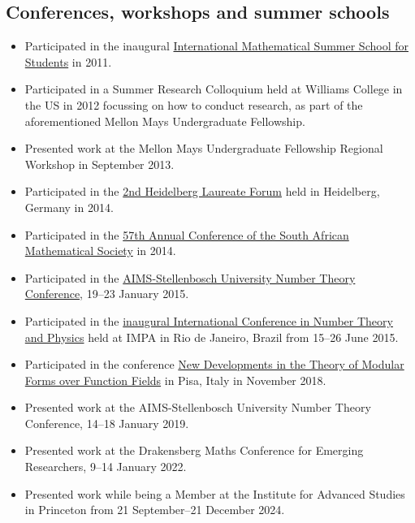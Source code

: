 \documentclass{article}
\begin{document}
\subsection{Conferences, workshops and summer schools}
\begin{itemize}
	\item Participated in the inaugural \href{http://math.jacobs-university.de/summerschool/2011}{International Mathematical Summer School for Students} in 2011.
	\item Participated in a Summer Research Colloquium held at Williams College in the US in 2012 focussing on how to conduct research, as part of the aforementioned Mellon Mays Undergraduate Fellowship.
	\item Presented work at the Mellon Mays Undergraduate Fellowship Regional Workshop in September 2013.
	\item Participated in the \href{http://www.heidelberg-laureate-forum.org/event_2014/}{2nd Heidelberg Laureate Forum} held in Heidelberg, Germany in 2014.
	\item Participated in the \href{http://www.unisa.ac.za/Default.asp?Cmd=ViewContent&ContentID=96795}{57th Annual Conference of the South African Mathematical Society} in 2014.
	\item Participated in the \href{http://www.aims.ac.za/en/research-centre/workshops-conferences/past/aims-stellenbosch-university-number-theory-conference-19-23-january-2015}{AIMS-Stellenbosch University Number Theory Conference}, 19--23 January 2015.
	\item Participated in the \href{http://www.impa.br/opencms/pt/eventos/store/evento_1504}{inaugural International Conference in Number Theory and Physics} held at IMPA in Rio de Janeiro, Brazil from 15--26 June 2015.
	\item Participated in the conference \href{https://dmvpisa2018.wordpress.com/}{New Developments in the Theory of Modular Forms over Function Fields} in Pisa, Italy in November 2018.
	\item Presented work at the AIMS-Stellenbosch University Number Theory Conference, 14--18 January 2019.
	\item Presented work at the Drakensberg Maths Conference for Emerging Researchers, 9--14 January 2022.
	\item Presented work while being a Member at the Institute for Advanced Studies in Princeton from 21 September--21 December 2024.
\end{itemize}
\end{document}
